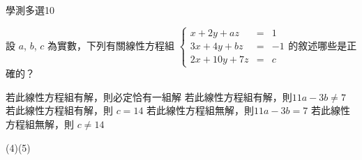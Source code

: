     \begin{QUESTION}
        \begin{ExamInfo}{98}{學測}{多選}{10}
        \end{ExamInfo}
        \begin{ExamAnsRateInfo}{8}{11}{6}{7}
        \end{ExamAnsRateInfo}
        \begin{QBODY}
            設 $a$, $b$, $c$ 為實數，下列有關線性方程組 $\left\{ \begin{array}{rlc}x+2y+az &=&1 \\ 3x+4y+bz &=& -1 \\ 2x+10y+7z &=& c  \end{array}\right.$的敘述哪些是正確的？
			\begin{QOPS} 
				\QOP 若此線性方程組有解，則必定恰有一組解 
				\QOP 若此線性方程組有解，則$11a-3b \neq 7$ 
				\QOP 若此線性方程組有解，則 $c=14$  
				\QOP 若此線性方程組無解，則$11a-3b=7$ 
				\QOP 若此線性方程組無解，則 $c\neq 14$
			\end{QOPS}
        \end{QBODY}
        \begin{QFROMS}
        \end{QFROMS}
        \begin{QTAGS}\end{QTAGS}
        \begin{QANS}
            (4)(5)
        \end{QANS}
        \begin{QSOLLIST}
        \end{QSOLLIST}
        \begin{QEMPTYSPACE}
        \end{QEMPTYSPACE}
    \end{QUESTION}
